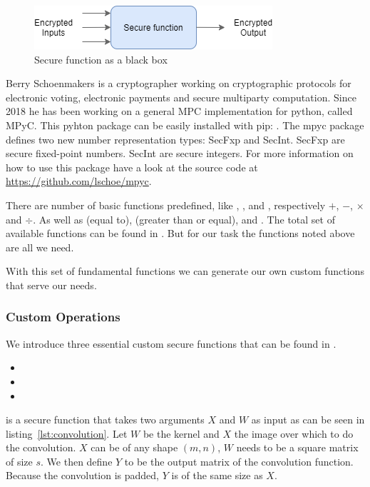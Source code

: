 \begin{figure}[H]
  \includegraphics[scale=0.8]{plots/blackbox.png}
  \centering
  \caption{Secure function as a black box}
  \label{fig:blackbox}
\end{figure}

Berry Schoenmakers is a cryptographer working on cryptographic protocols for electronic voting, electronic payments and secure multiparty computation. Since 2018 he has been working on a general MPC implementation for python, called MPyC. This pyhton package can be easily installed with pip: . The mpyc package defines two new number representation types: SecFxp and SecInt. SecFxp are secure fixed-point numbers. SecInt are secure integers. For more information on how to use this package have a look at the source code at \url{https://github.com/lschoe/mpyc}.

There are number of basic functions predefined, like , ,  and , respectively $+$, $-$, $\times$ and $\div$. As well as  (equal to),  (greater than or equal),  and . The total set of available functions can be found in . But for our task the functions noted above are all we need.

With this set of fundamental functions we can generate our own custom functions that serve our needs.

\subsubsection{Custom Operations}

We introduce three essential custom secure functions that can be found in .

\begin{itemize}
  \item {}
  \item {}
  \item {}
\end{itemize}

 is a secure function that takes two arguments $X$ and $W$ as input as can be seen in listing~\ref{lst:convolution}. Let $W$ be the kernel and $X$ the image over which to do the convolution. $X$ can be of any shape $(m, n)$, $W$ needs to be a square matrix of size $s$. We then define $Y$ to be the output matrix of the convolution function. Because the convolution is padded, $Y$ is of the same size as $X$.

